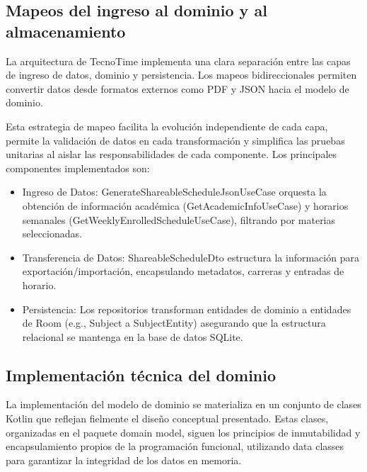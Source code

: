 \subsection{Mapeos del ingreso al dominio y al almacenamiento}
La arquitectura de TecnoTime implementa una clara separación entre las capas de ingreso de datos, dominio y persistencia. Los mapeos bidireccionales permiten convertir datos desde formatos externos como PDF y JSON hacia el modelo de dominio.

Esta estrategia de mapeo facilita la evolución independiente de cada capa, permite la validación de datos en cada transformación y simplifica las pruebas unitarias al aislar las responsabilidades de cada componente. Los principales componentes implementados son:

\begin{itemize}
  \item Ingreso de Datos: GenerateShareableScheduleJsonUseCase orquesta la obtención de información académica (GetAcademicInfoUseCase) y horarios semanales (GetWeeklyEnrolledScheduleUseCase), filtrando por materias seleccionadas.
  \item Transferencia de Datos: ShareableScheduleDto estructura la información para exportación/importación, encapsulando metadatos, carreras y entradas de horario.
  \item Persistencia: Los repositorios transforman entidades de dominio a entidades de Room (e.g., Subject a SubjectEntity) asegurando que la estructura relacional se mantenga en la base de datos SQLite.
\end{itemize}

\subsection{Implementación técnica del dominio}
La implementación del modelo de dominio se materializa en un conjunto de clases Kotlin que reflejan fielmente el diseño conceptual presentado. Estas clases, organizadas en el paquete domain model, siguen los principios de inmutabilidad y encapsulamiento propios de la programación funcional, utilizando data classes para garantizar la integridad de los datos en memoria.

